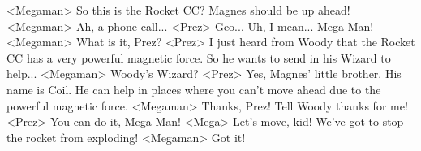 <Megaman> So this is the Rocket CC? 
Magnes should be up ahead! 
<Megaman> Ah, a phone call... 
<Prez> Geo... Uh, I mean... Mega Man! 
<Megaman> What is it, Prez? 
<Prez> I just heard from Woody that the Rocket CC has 
a very powerful magnetic force. 
So he wants to send in his Wizard to help... 
<Megaman> Woody's Wizard? 
<Prez> Yes, Magnes' little brother. His name is Coil. 
He can help in places where you can't move 
ahead due to the powerful magnetic force. 
<Megaman> Thanks, Prez! Tell Woody thanks for me! 
<Prez> You can do it, Mega Man! 
<Mega> Let's move, kid! 
We've got to stop the rocket from exploding! 
<Megaman> Got it! 

